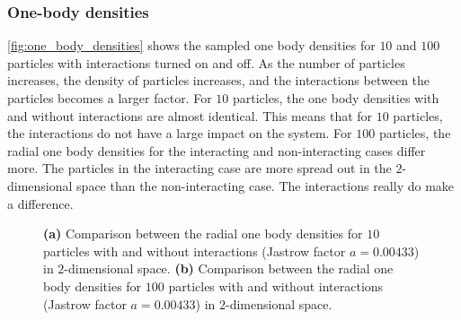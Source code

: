\subsubsection{One-body densities}
\autoref{fig:one_body_densities} shows the sampled one body densities for $10$ and $100$ particles with interactions turned on and off. As the number of particles increases, the density of particles increases, and the interactions between the particles becomes a larger factor. For $10$ particles, the one body densities with and without interactions are almost identical. This means that for $10$ particles, the interactions do not have a large impact on the system. For $100$ particles, the radial one body densities for the interacting and non-interacting cases differ more. The particles in the interacting case are more spread out in the $2$-dimensional space than the non-interacting case. The interactions really do make a difference. 
\begin{figure}[H]
\centering
{}
\qquad
{}
\caption{\textbf{(a)} Comparison between the radial one body densities for $10$ particles with and without interactions (Jastrow factor $a=0.00433$) in $2$-dimensional space. \textbf{(b)} Comparison between the radial one body densities for $100$ particles with and without interactions (Jastrow factor $a=0.00433$) in $2$-dimensional space.}
\label{fig:one_body_densities}
\end{figure}